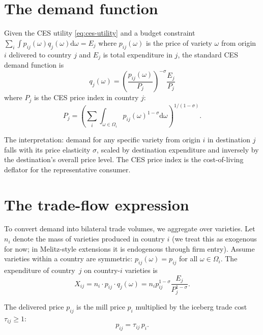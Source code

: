 \documentclass[11pt,letterpaper,oneside]{book}
\theoremstyle{definition}
\theoremstyle{remark}
\newcommand{\diff}{\mathrm{d}}
\begin{document}
\section{The demand function}

Given the CES utility \eqref{eq:ces-utility} and a budget constraint $\sum_i \int p_{ij}(\omega) q_j(\omega) \diff \omega = E_j$ where $p_{ij}(\omega)$ is the price of variety $\omega$ from origin $i$ delivered to country $j$ and $E_j$ is total expenditure in $j$, the standard CES demand function is
\begin{equation}
q_j(\omega) = \left( \frac{p_{ij}(\omega)}{P_j} \right)^{-\sigma} \frac{E_j}{P_j}
\label{eq:ces-demand}
\end{equation}
where $P_j$ is the CES price index in country $j$:
\begin{equation}
P_j = \left( \sum_i \int_{\omega \in \Omega_i} p_{ij}(\omega)^{1-\sigma} \diff \omega \right)^{1/(1-\sigma)}.
\label{eq:ces-price-index}
\end{equation}

The interpretation: demand for any specific variety from origin $i$ in destination $j$ falls with its price elasticity $\sigma$, scaled by destination expenditure and inversely by the destination's overall price level. The CES price index is the cost-of-living deflator for the representative consumer.

\section{The trade-flow expression}

To convert demand into bilateral trade volumes, we aggregate over varieties. Let $n_i$ denote the mass of varieties produced in country $i$ (we treat this as exogenous for now; in Melitz-style extensions it is endogenous through firm entry). Assume varieties within a country are symmetric: $p_{ij}(\omega) = p_{ij}$ for all $\omega \in \Omega_i$. The expenditure of country~$j$ on country-$i$ varieties is
\begin{equation}
X_{ij} = n_i \cdot p_{ij} \cdot q_j(\omega) = n_i p_{ij}^{1-\sigma} \frac{E_j}{P_j^{1-\sigma}}.
\label{eq:trade-flow-prelim}
\end{equation}

The delivered price $p_{ij}$ is the mill price $p_i$ multiplied by the iceberg trade cost $\tau_{ij} \geq 1$:
\begin{equation}
p_{ij} = \tau_{ij} \, p_i.
\label{eq:delivered-price}
\end{equation}
\end{document}
